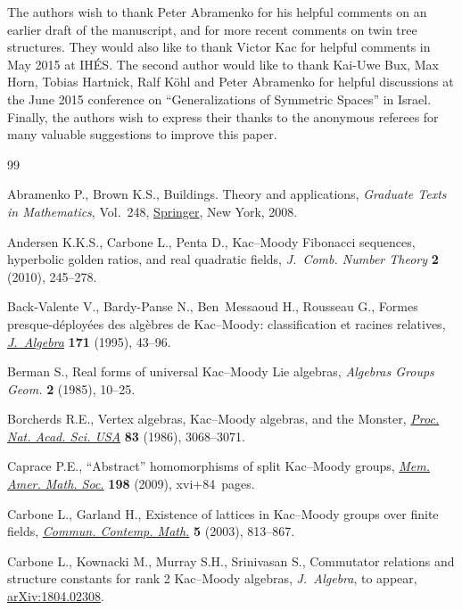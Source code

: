 \documentclass[pdftex]{sigma}
\numberwithin{equation}{section}
\begin{document}
The authors wish to thank Peter Abramenko for his helpful comments on an earlier draft of the manuscript, and for more recent comments on twin tree structures. They would also like to thank Victor Kac for helpful comments in May 2015 at IH\'ES. The second author would like to thank Kai-Uwe Bux, Max Horn, Tobias Hartnick, Ralf K\"ohl and Peter Abramenko for helpful discussions at the June 2015 conference on ``Generalizations of Symmetric Spaces'' in Israel. Finally, the authors wish to express their thanks to the anonymous referees for many valuable suggestions to improve this paper.

\begin{thebibliography}{99}
\footnotesize\itemsep=0pt

Abramenko P., Brown K.S., Buildings. Theory and applications, \textit{Graduate
 Texts in Mathematics}, Vol.~248, \href{https://doi.org/10.1007/978-0-387-78835-7}{Springer}, New York, 2008.

Andersen K.K.S., Carbone L., Penta D., Kac--{M}oody {F}ibonacci sequences,
 hyperbolic golden ratios, and real quadratic fields, \textit{J.~Comb. Number
 Theory} \textbf{2} (2010), 245--278.

Back-Valente V., Bardy-Panse N., Ben~Messaoud H., Rousseau G., Formes
 presque-d\'eploy\'ees des alg\`ebres de {K}ac--{M}oody: classification et
 racines relatives, \href{https://doi.org/10.1006/jabr.1995.1004}{\textit{J.~Algebra}} \textbf{171} (1995), 43--96.

Berman S., Real forms of universal {K}ac--{M}oody {L}ie algebras,
 \textit{Algebras Groups Geom.} \textbf{2} (1985), 10--25.

Borcherds R.E., Vertex algebras, {K}ac--{M}oody algebras, and the {M}onster,
 \href{https://doi.org/10.1073/pnas.83.10.3068}{\textit{Proc. Nat. Acad. Sci. USA}} \textbf{83} (1986), 3068--3071.

Caprace P.E., ``{A}bstract'' homomorphisms of split {K}ac--{M}oody groups,
 \href{https://doi.org/10.1090/memo/0924}{\textit{Mem. Amer. Math. Soc.}} \textbf{198} (2009), xvi+84~pages.

Carbone L., Garland H., Existence of lattices in {K}ac--{M}oody groups over
 finite fields, \href{https://doi.org/10.1142/S0219199703001117}{\textit{Commun. Contemp. Math.}} \textbf{5} (2003), 813--867.

Carbone L., Kownacki M., Murray S.H., Srinivasan S., Commutator relations and
 structure constants for rank 2 {K}ac--{M}oody algebras, \textit{J.~Algebra},
 {t}o appear, \href{https://arxiv.org/abs/1804.02308}{arXiv:1804.02308}.


\end{thebibliography}
\end{document}
